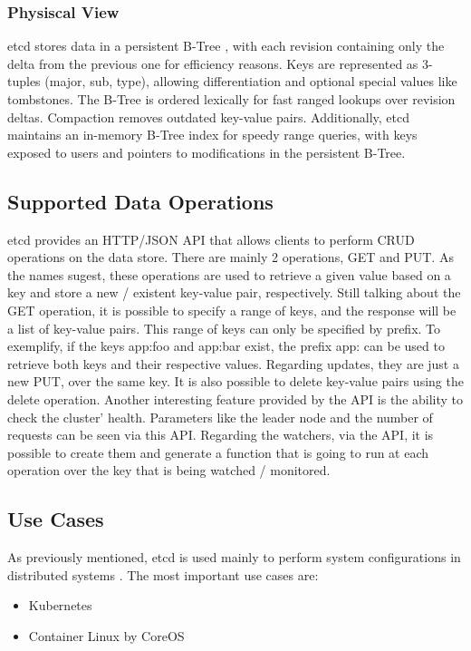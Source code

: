 \documentclass[screen,review]{acmart}
\begin{document}
\subsubsection{Physiscal View}
etcd stores data in a persistent B-Tree \cite{b-tree}, with each revision containing only the delta from the previous one for efficiency reasons. Keys are represented as 3-tuples (major, sub, type), allowing differentiation and optional special values like tombstones. The B-Tree is ordered lexically for fast ranged lookups over revision deltas. Compaction removes outdated key-value pairs. Additionally, etcd maintains an in-memory B-Tree index for speedy range queries, with keys exposed to users and pointers to modifications in the persistent B-Tree.

\subsection{Supported Data Operations}
etcd provides an HTTP/JSON API \cite{microsoft} that allows clients to perform CRUD operations on the data store.
There are mainly 2 operations, GET and PUT. As the names sugest, these operations are used to retrieve a given value based on a key and store a new / existent key-value pair, respectively.
Still talking about the GET operation, it is possible to specify a range of keys, and the response will be a list of key-value pairs. This range of keys can only be specified by prefix. To exemplify, if the keys app:foo and app:bar exist, the prefix app: can be used to retrieve both keys and their respective values.
Regarding updates, they are just a new PUT, over the same key.
It is also possible to delete key-value pairs using the delete operation.
Another interesting feature provided by the API is the ability to check the cluster' health. Parameters like the leader node and the number of requests can be seen via this API.
Regarding the watchers, via the API, it is possible to create them and generate a function that is going to run at each operation over the key that is being watched / monitored\cite{etcd_api}.

\subsection{Use Cases}
As previously mentioned, etcd is used mainly to perform system configurations in distributed systems \cite{etcd_why}.
The most important use cases are:

\begin{itemize}
    \item Kubernetes
    \item Container Linux by CoreOS
\end{itemize}
\end{document}
